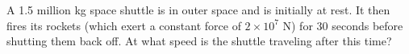 \question[10] A  1.5 million kg space shuttle is in outer space and is initially at rest. It then fires its rockets (which exert a constant force of $2\times 10^{7}$ N) for 30 seconds before shutting them back off. At what speed is the shuttle traveling after this time?
